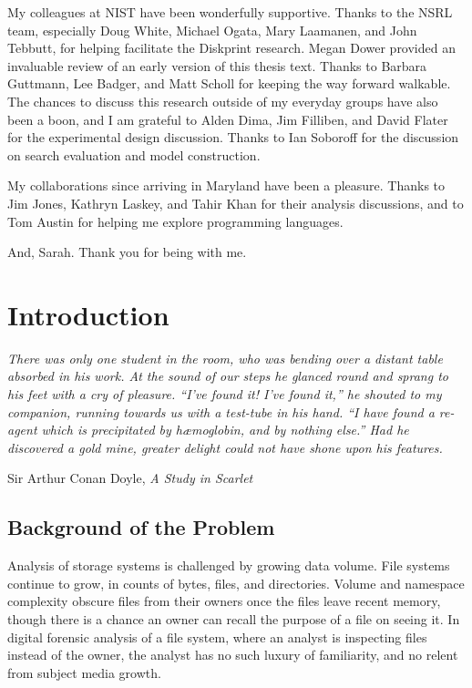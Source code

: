 \documentclass[11pt]{ucthesis}
\theoremstyle{plain}
\theoremstyle{definition}
\begin{document}
\begin{frontmatter}
\begin{acknowledgements}
My colleagues at NIST have been wonderfully supportive.  Thanks to the NSRL team, especially Doug White, Michael Ogata, Mary Laamanen, and John Tebbutt, for helping facilitate the Diskprint research.  Megan Dower provided an invaluable review of an early version of this thesis text.  Thanks to Barbara Guttmann, Lee Badger, and Matt Scholl for keeping the way forward walkable.  The chances to discuss this research outside of my everyday groups have also been a boon, and I am grateful to Alden Dima, Jim Filliben, and David Flater for the experimental design discussion.  Thanks to Ian Soboroff for the discussion on search evaluation and model construction.

My collaborations since arriving in Maryland have been a pleasure.  Thanks to Jim Jones, Kathryn Laskey, and Tahir Khan for their analysis discussions, and to Tom Austin for helping me explore programming languages.

And, Sarah.  Thank you for being with me.
\end{acknowledgements}

\end{frontmatter}


\chapter{Introduction}

\setlength\epigraphwidth{12cm}
\epigraph{\small{\itshape{There was only one student in the room, who was bending over a distant table absorbed in his work.  At the sound of our steps he glanced round and sprang to his feet with a cry of pleasure.  ``I've found it!  I've found it,'' he shouted to my companion, running towards us with a test-tube in his hand.  ``I have found a re-agent which is precipitated by h{\ae}moglobin, and by nothing else.''  Had he discovered a gold mine, greater delight could not have shone upon his features.}}}{Sir Arthur Conan Doyle, \textit{A Study in Scarlet} \cite{doyle:bantam03}}


\section{Background of the Problem}

Analysis of storage systems is challenged by growing data volume.  File systems continue to grow, in counts of bytes, files, and directories.  Volume and namespace complexity obscure files from their owners once the files leave recent memory, though there is a chance an owner can recall the purpose of a file on seeing it.  In digital forensic analysis of a file system, where an analyst is inspecting files instead of the owner, the analyst has no such luxury of familiarity, and no relent from subject media growth.
\end{document}
